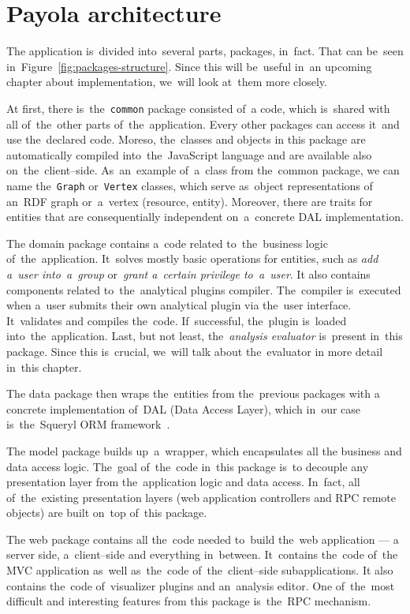 \section{Payola architecture}
The application is~divided into~several parts, packages, in~fact. That can be~seen in~Figure~\ref{fig:packages-structure}. Since this will be~useful in~an upcoming
chapter about implementation, we~will look at~them more closely.

At first, there is~the~\texttt{common} package consisted of~a code, which is~shared with all of~the~other parts of~the~application. Every other packages can 
access it~and use the~declared code. Moreso, the~classes and objects 
in this package are automatically compiled into~the~JavaScript language and are available
also on~the~client--side. As~an~example of~a~class from the~common package, we
can name the~\texttt{Graph} or~\texttt{Vertex} classes, which serve as~object representations
of an~RDF graph or~a~vertex (resource, entity). Moreover, there are traits for 
entities that are consequentially independent on~a~concrete DAL implementation.

The domain package contains a~code related to~the~business logic of~the~application. It~solves mostly basic operations for entities, such as
\emph{add a~user into~a~group} or~\emph{grant a~certain privilege to~a~user}.
It also contains components related to~the~analytical plugins compiler. The~compiler is~executed when a~user submits their own analytical plugin via the~user 
interface. It~validates and compiles the~code. If~successful, the~plugin is~loaded into~the~application. Last, but not least, the~\emph{analysis evaluator} is~present in~this package. Since this is~crucial, we~will talk about the~evaluator
in more detail in~this chapter.

The data package then wraps the~entities from the~previous packages with a
concrete implementation of~DAL (Data Access Layer), which in~our case is~the~Squeryl
ORM framework~\cite{squeryl}.

The model package builds up~a~wrapper, which encapsulates all the
business and data access logic. The~goal of~the~code in~this package is~to decouple
any presentation layer from the~application logic and data access. In~fact,
all of~the~existing presentation layers (web application controllers and
RPC remote objects) are built on~top of~this package. 

The web package contains all the~code needed to~build the~web application --- 
a server side, a~client--side and everything in~between. It~contains the~code of~the MVC application as~well as~the~code of~the~client--side subapplications.
It also contains the~code of~visualizer plugins and an~analysis editor. One of~the~most difficult and interesting features from this package is~the~RPC mechanism.


